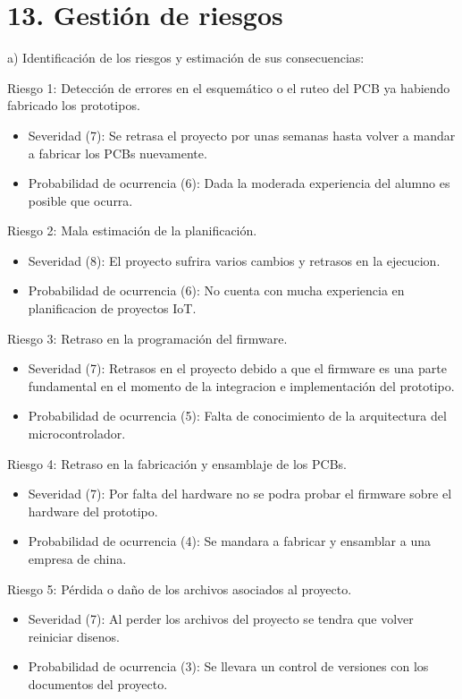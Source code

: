 \documentclass[
11pt, %
codirector, %
]{charter}
\begin{document}
\section{13. Gestión de riesgos}
\label{sec:riesgos}
a) Identificación de los riesgos y estimación de sus consecuencias:

Riesgo 1: Detección de errores en el esquemático o el ruteo del PCB ya habiendo fabricado los prototipos.
\begin{itemize}
	\item Severidad (7): Se retrasa el proyecto por unas semanas hasta volver a mandar a fabricar los PCBs nuevamente.
	\item Probabilidad de ocurrencia (6): Dada la moderada experiencia del alumno es posible que ocurra.
\end{itemize}  

Riesgo 2: Mala estimación de la planificación.
\begin{itemize}
	\item Severidad (8): El proyecto sufrira varios cambios y retrasos en la ejecucion.
	\item Probabilidad de ocurrencia (6): No cuenta con mucha experiencia en planificacion de proyectos IoT.
\end{itemize}

Riesgo 3: Retraso en la programación del firmware.
\begin{itemize}
	\item Severidad (7): Retrasos en el proyecto debido a que el firmware es una parte fundamental en el momento de la integracion e implementación del prototipo.
	\item Probabilidad de ocurrencia (5): Falta de conocimiento de la arquitectura del microcontrolador.
\end{itemize}  

Riesgo 4: Retraso en la fabricación y ensamblaje de los PCBs.
\begin{itemize}
	\item Severidad (7): Por falta del hardware no se podra probar el firmware sobre el hardware del prototipo.
	\item Probabilidad de ocurrencia (4): Se mandara a fabricar y ensamblar a una empresa de china. 
\end{itemize}

Riesgo 5: Pérdida o daño de los archivos asociados al proyecto.
\begin{itemize}
	\item Severidad (7): Al perder los archivos del proyecto se tendra que volver reiniciar disenos.
	\item Probabilidad de ocurrencia (3): Se llevara un control de versiones con los documentos del proyecto.
\end{itemize}  
\end{document}
